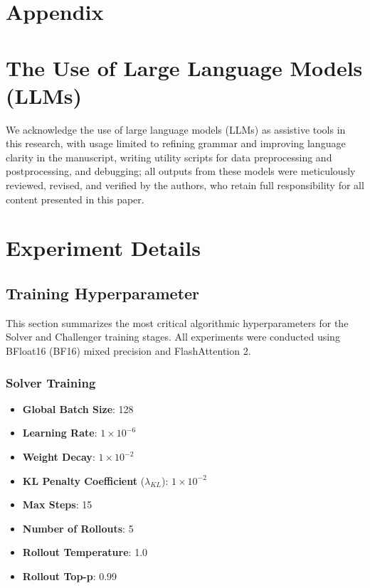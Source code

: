 \section*{Appendix}

\section{The Use of Large Language Models (LLMs)}
We acknowledge the use of large language models (LLMs) as assistive tools in this research, with usage limited to refining grammar and improving language clarity in the manuscript, writing utility scripts for data preprocessing and postprocessing, and debugging; all outputs from these models were meticulously reviewed, revised, and verified by the authors, who retain full responsibility for all content presented in this paper.


\section{Experiment Details}
\label{app:traininghyper}
\subsection{Training Hyperparameter}
This section summarizes the most critical algorithmic hyperparameters for the Solver and Challenger training stages. All experiments were conducted using BFloat16 (BF16) mixed precision and FlashAttention 2.

\subsubsection{Solver Training}
\begin{itemize}
    \item \textbf{Global Batch Size}: 128
    \item \textbf{Learning Rate}: $1 \times 10^{-6}$
    \item \textbf{Weight Decay}: $1 \times 10^{-2}$
    \item \textbf{KL Penalty Coefficient} ($\lambda_{KL}$): $1 \times 10^{-2}$
    \item \textbf{Max Steps}: 15
    \item \textbf{Number of Rollouts}: 5
    \item \textbf{Rollout Temperature}: 1.0
    \item \textbf{Rollout Top-p}: 0.99
\end{itemize}

